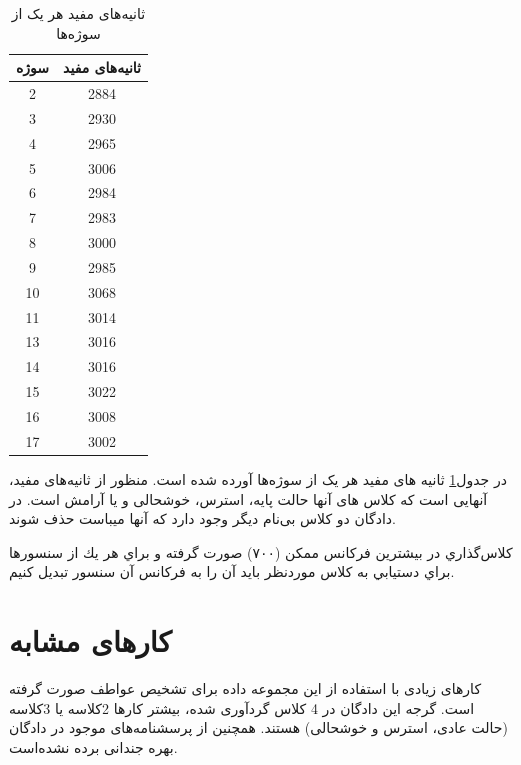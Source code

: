 \documentclass[12pt]{report}
\begin{document}
	\begin{table}[h]
		\begin{tabular}{|c|c|}
			\hline
			
			سوژه & ثانیه‌های مفید \\
			\hline
			2 & 2884\\
			3 & 2930\\
			4 & 2965\\
			5 & 3006\\
			6 & 2984\\
			7 & 2983\\
			8 & 3000\\
			9 & 2985\\
			10 &3068\\
			11 &3014\\
			13 &3016\\
			14 &3016\\
			15 &3022\\
			16 &3008\\
			17 &3002\\
			\hline
		\end{tabular}
		\caption{ثانیه‌های مفید هر یک از سوژه‌ها}
		\label{classes}
		
	\end{table}
	در جدول\ref{classes} ثانیه های مفید هر یک از سوژه‌ها آورده شده است. منظور از ثانیه‌های مفید، آنهایی است که کلاس های آنها حالت پایه، استرس، خوشحالی و یا آرامش است. در دادگان دو کلاس بی‌نام دیگر وجود دارد که آنها میباست حذف شوند.
	
	ﻛﻼﺱگذﺍﺭﻱ ﺩﺭ ﺑﻴﺸﺘﺮﻳﻦ ﻓﺮﻛﺎﻧﺲ ﻣﻤﻜﻦ (۷۰۰) ﺻﻮﺭﺕ گرﻓﺘﻪ ﻭ ﺑﺮﺍﻱ ﻫﺮ ﻳﻚ ﺍﺯ ﺳﻨﺴﻮﺭﻫﺎ ﺑﺮﺍﻱ ﺩﺳﺘﻴﺎﺑﻲ ﺑﻪ ﻛﻼﺱ ﻣﻮﺭﺩﻧﻈﺮ ﺑﺎﻳﺪ ﺁﻥ ﺭﺍ ﺑﻪ ﻓﺮﻛﺎﻧﺲ ﺁﻥ ﺳﻨﺴﻮﺭ ﺗﺒﺪﻳﻞ ﻛﻨﻴﻢ.
	
	
	\chapter{کارهای مشابه}
	کارهای زیادی با استفاده از این مجموعه داده برای تشخیص عواطف صورت گرفته است. گرجه این دادگان در 4 کلاس گردآوری شده، بیشتر کارها 2کلاسه یا 3کلاسه (حالت عادی، استرس و خوشحالی) هستند. همچنین از پرسشنامه‌های موجود در دادگان بهره جندانی برده نشده‌است.
	
\end{document}
